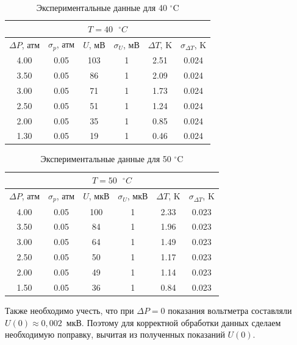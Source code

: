 \documentclass[a4paper,12pt]{article} %
\begin{document}
\begin{table}[H]
	\centering
	\begin{tabular}{|c|c|c|c|c|c|}
		\hline
		\multicolumn{6}{|c|}{$ T = 40 \text{ } ^\circ C $} \\ \hline
		$ \Delta P $, атм & $ \sigma_p $, атм & $ U $, мВ & $ \sigma_U $, мВ & $ \Delta T $, K & $ \sigma_{\Delta T} $, K \\ \hline
		4.00 & 0.05 & 103 & 1 & 2.51  & 0.024 \\ \hline
        3.50 & 0.05 & 86  & 1 & 2.09  & 0.024 \\ \hline
        3.00 & 0.05 & 71  & 1 & 1.73  & 0.024 \\ \hline
        2.50 & 0.05 & 51  & 1 & 1.24  & 0.024 \\ \hline
        2.00 & 0.05 & 35  & 1 & 0.85  & 0.024 \\ \hline
        1.30 & 0.05 & 19  & 1 & 0.46  & 0.024 \\ \hline
	\end{tabular}
	\caption{Экспериментальные данные для 40 $^\circ$C}
	\label{tab:40C}
\end{table}

\begin{table}[H]
	\centering
	\begin{tabular}{|c|c|c|c|c|c|}
		\hline
		\multicolumn{6}{|c|}{$ T = 50 \text{ } ^\circ C $} \\ \hline
		$ \Delta P $, атм & $ \sigma_p $, атм & $ U $, мкВ & $ \sigma_U $, мкВ & $ \Delta T $, K & $ \sigma_{\Delta T} $, K \\ \hline
		4.00 & 0.05 & 100 & 1 & 2.33 & 0.023 \\ \hline
        3.50 & 0.05 & 84  & 1 & 1.96 & 0.023 \\ \hline
        3.00 & 0.05 & 64  & 1 & 1.49 & 0.023 \\ \hline
        2.50 & 0.05 & 50  & 1 & 1.17 & 0.023 \\ \hline
        2.00 & 0.05 & 49  & 1 & 1.14 & 0.023 \\ \hline
        1.50 & 0.05 & 36  & 1 & 0.84 & 0.023 \\ \hline
	\end{tabular}
	\caption{Экспериментальные данные для 50 $^\circ$C}
	\label{tab:50C}
\end{table}

Также необходимо учесть, что при $ \Delta P = 0$ показания вольтметра составляли $ U(0) \approx 0,002 $~мкВ. Поэтому для корректной обработки данных сделаем необходимую поправку, вычитая из полученных показаний $ U(0) $.
\end{document}
